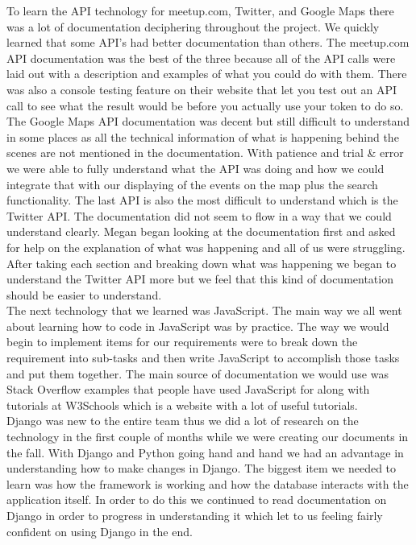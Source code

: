 \documentclass[draftclsnofoot,10pt,onecolumn]{IEEEtran} %
\begin{document}
To learn the API technology for meetup.com, Twitter, and Google Maps there was a lot of documentation deciphering throughout 
the project. We quickly learned that some API's had better documentation than others. The meetup.com API documentation was the 
best of the three because all of the API calls were laid out with a description and examples of what you could do with them. 
There was also a console testing feature on their website that let you test out an API call to see what the result would be 
before you actually use your token to do so. The Google Maps API documentation was decent but still difficult to understand 
in some places as all the technical information of what is happening behind the scenes are not mentioned in the documentation. 
With patience and trial \& error we were able to fully understand what the API was doing and how we could integrate that 
with our displaying of the events on the map plus the search functionality. The last API is also the most difficult to 
understand which is the Twitter API. The documentation did not seem to flow in a way that we could understand clearly. Megan 
began looking at the documentation first and asked for help on the explanation of what was happening and all of us were 
struggling. After taking each section and breaking down what was happening we began to understand the Twitter API more but 
we feel that this kind of documentation should be easier to understand. \\

The next technology that we learned was JavaScript. The main way we all went about learning how to code in JavaScript was by 
practice. The way we would begin to implement items for our requirements were to break down the requirement into sub-tasks and 
then write JavaScript to accomplish those tasks and put them together. The main source of documentation we would use was 
Stack Overflow examples that people have used JavaScript for along with tutorials at W3Schools which is a website with a lot of 
useful tutorials. \\

Django was new to the entire team thus we did a lot of research on the technology in the first couple of months while we were 
creating our documents in the fall. With Django and Python going hand and hand we had an advantage in understanding how to 
make changes in Django. The biggest item we needed to learn was how the framework is working and how the database interacts 
with the application itself. In order to do this we continued to read documentation on Django in order to progress in understanding
it which let to us feeling fairly confident on using Django in the end. \\
\end{document}
